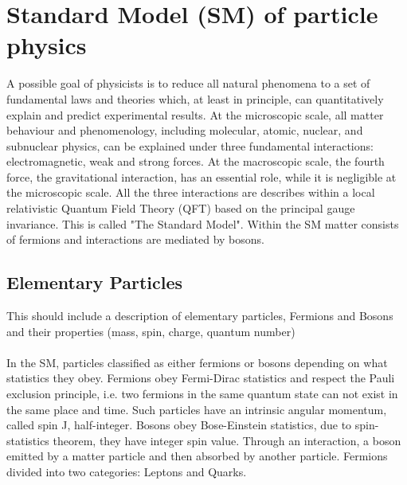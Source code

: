 \section{Standard Model (SM) of particle physics}
\label{chap1:SM}
A possible goal of physicists is to reduce all natural phenomena to a set of fundamental laws and theories which, at least in principle, can quantitatively explain and predict experimental results. At the microscopic scale, all matter behaviour and phenomenology, including molecular, atomic, nuclear, and subnuclear physics, can be explained under three fundamental interactions: electromagnetic, weak and strong forces. At the macroscopic scale, the fourth force, the gravitational interaction, has an essential role, while it is negligible at the microscopic scale. All the three interactions are describes within a local relativistic Quantum Field Theory (QFT) based on the principal gauge invariance. This is called "The Standard Model". Within the SM matter consists of fermions and interactions are mediated by bosons. 

\subsection{Elementary Particles}
\label{chap1:SM:EP}

This should include a description of elementary particles, Fermions and  Bosons and their properties (mass, spin, charge, quantum number)
\\
\\
In the SM, particles classified as either fermions or bosons depending on what statistics they obey. Fermions obey Fermi-Dirac statistics and respect the Pauli exclusion principle, i.e. two fermions in the same quantum state can not exist in the same place and time. Such particles have an intrinsic angular momentum, called spin J, half-integer. Bosons obey Bose-Einstein statistics, due to spin-statistics theorem, they have integer spin value. Through an interaction, a boson emitted by a matter particle and then absorbed by another particle. Fermions divided into two categories: Leptons and Quarks.
